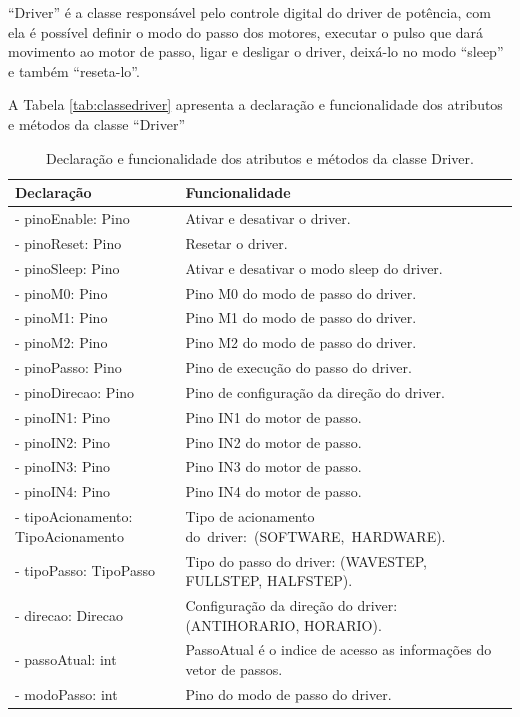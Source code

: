 “Driver” é a classe responsável pelo controle digital do driver de potência, com ela é possível definir 
o modo do passo dos motores, executar o pulso que dará movimento ao motor de passo, ligar e desligar 
o driver, deixá-lo no modo “sleep” e também “reseta-lo”.

A Tabela \ref{tab:classedriver} apresenta a declaração e funcionalidade dos atributos e métodos da 
classe “Driver”

\begin{table}[!htb]
    \centering
    \caption{Declaração e funcionalidade dos atributos e métodos da classe Driver.}
    \begin{tabular}{p{8cm}p{6cm}}
        \hline
        \textbf{Declaração} & \textbf{Funcionalidade}\\
        \hline
        - pinoEnable: Pino & Ativar e desativar o driver.\\
        - pinoReset: Pino & Resetar o driver.\\
        - pinoSleep: Pino & Ativar e desativar o modo sleep do driver.\\
        - pinoM0: Pino & Pino M0 do modo de passo do driver.\\
        - pinoM1: Pino & Pino M1 do modo de passo do driver.\\
        - pinoM2: Pino & Pino M2 do modo de passo do driver.\\
        - pinoPasso: Pino & Pino de execução do passo do driver.\\
        - pinoDirecao: Pino & Pino de configuração da direção do driver.\\
        - pinoIN1: Pino & Pino IN1 do motor de passo.\\
        - pinoIN2: Pino & Pino IN2 do motor de passo.\\
        - pinoIN3: Pino & Pino IN3 do motor de passo.\\
        - pinoIN4: Pino & Pino IN4 do motor de passo.\\
        - tipoAcionamento: TipoAcionamento & Tipo de acionamento do~driver:~(SOFTWARE,~HARDWARE).\\
        - tipoPasso: TipoPasso & Tipo do passo do driver: (WAVESTEP, FULLSTEP, HALFSTEP).\\
        - direcao: Direcao & Configuração da direção do driver: (ANTIHORARIO, HORARIO).\\
        - passoAtual: int & PassoAtual é o indice de acesso as informações do vetor de passos.\\
        - modoPasso: int & Pino do modo de passo do driver.\\

\end{tabular}
\end{table}

